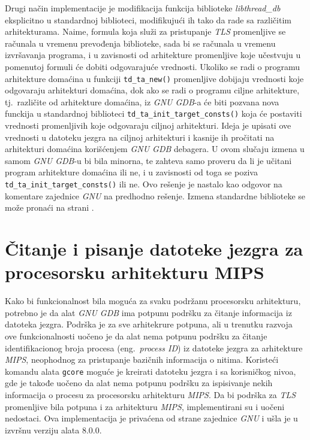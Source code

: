 \documentclass[12pt,oneside]{memoir}
\begin{document}
Drugi način implementacije je modifikacija funkcija biblioteke \emph{libthread\_db} eksplicitno u standardnoj biblioteci, modifikujući ih tako da rade sa različitim arhitekturama. Naime, formula koja služi za pristupanje \emph{TLS} promenljive se računala u vremenu prevođenja biblioteke, sada bi se računala u vremenu izvršavanja programa, i u zavisnosti od arhitekture promenljive koje učestvuju u pomenutoj formuli će dobiti odgovarajuće vrednosti. Ukoliko se radi o programu arhitekture domaćina u funkciji  \texttt{td\_ta\_new()} promenljive dobijaju vrednosti koje odgovaraju arhitekturi domaćina, dok ako se radi o programu ciljne arhitekture, tj.~različite od arhitekture domaćina, iz \emph{GNU GDB}-a će biti pozvana nova funckija u standardnoj biblioteci \texttt{td\_ta\_init\_target\_consts()} koja će postaviti vrednosti promenljivih koje odgovaraju ciljnoj arhitekturi. Ideja je upisati ove vrednosti u datoteku jezgra na ciljnoj arhitekturi i kasnije ih pročitati na arhitekturi domaćina korišćenjem \emph{GNU GDB} debagera. U ovom slučaju izmena u samom \emph{GNU GDB}-u bi bila minorna, te zahteva samo proveru da li je učitani program arhitekture domaćina ili ne, i u zavisnosti od toga se poziva \texttt{td\_ta\_init\_target\_consts()} ili ne. Ovo rešenje je nastalo kao odgovor na komentare zajednice \emph{GNU} na predhodno rešenje. Izmena standardne biblioteke se može pronaći na strani \cite{GLIBCPATCH}.

\section{Čitanje i pisanje datoteke jezgra za procesorsku arhitekturu MIPS}

Kako bi funkcionalnost bila moguća za svaku podržanu procesorsku arhitekturu, potrebno je da alat \emph{GNU GDB} ima potpunu podršku za čitanje informacija iz datoteka jezgra. Podrška je za sve arhitekrure potpuna, ali u trenutku razvoja ove funkcionalnosti uočeno je da alat nema potpunu podršku za čitanje identifikacionog broja procesa (eng.~\emph{process ID}) iz datoteke jezgra za arhitekture \emph{MIPS}, neophodnog za pristupanje bazičnih informacija o nitima. Koristeći komandu alata \texttt{gcore} moguće je kreirati datoteku jezgra i sa korisničkog nivoa, gde je takođe uočeno da alat nema potpunu podršku za ispisivanje nekih informacija o procesu za procesorsku arhitekturu \emph{MIPS}. Da bi podrška za \emph{TLS} promenljive bila potpuna i za arhitekturu \emph{MIPS}, implementirani su i uočeni nedostaci. Ova implementacija je privaćena od strane zajednice \emph{GNU} i ušla je u izvršnu verziju alata 8.0.0.
\end{document}
